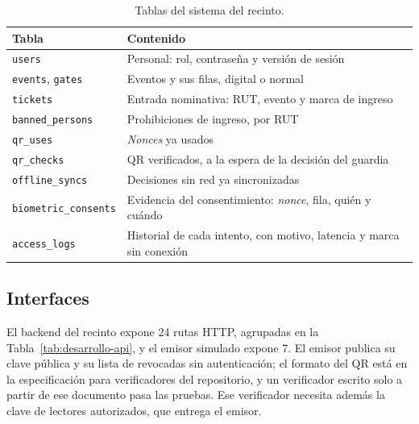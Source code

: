 \begin{table}[htbp]
  \centering
  \caption{Tablas del sistema del recinto.}
  \label{tab:desarrollo-datos}
  \small
  \begin{tabular}{p{3.6cm}p{10.0cm}}
    \toprule
    Tabla & Contenido \\
    \midrule
    \texttt{users} & Personal: rol, contraseña y versión de sesión \\
    \texttt{events}, \texttt{gates} & Eventos y sus filas, digital o normal \\
    \texttt{tickets} & Entrada nominativa: RUT, evento y marca de ingreso \\
    \texttt{banned\_persons} & Prohibiciones de ingreso, por RUT \\
    \texttt{qr\_uses} & \textit{Nonces} ya usados \\
    \texttt{qr\_checks} & QR verificados, a la espera de la decisión del guardia \\
    \texttt{offline\_syncs} & Decisiones sin red ya sincronizadas \\
    \texttt{biometric\_consents} & Evidencia del consentimiento: \textit{nonce}, fila, quién y cuándo \\
    \texttt{access\_logs} & Historial de cada intento, con motivo, latencia y marca sin conexión \\
    \bottomrule
  \end{tabular}
\end{table}

\subsection{Interfaces}
\label{subsec:desarrollo-api}

El backend del recinto expone 24 rutas HTTP, agrupadas en la Tabla~\ref{tab:desarrollo-api}, y el emisor simulado
expone 7. El emisor publica su clave pública y su lista de revocadas sin autenticación; el formato del QR está en
la especificación para verificadores del repositorio, y un verificador escrito solo a partir de ese documento
pasa las pruebas. Ese verificador necesita además la clave de lectores autorizados, que entrega el emisor.

